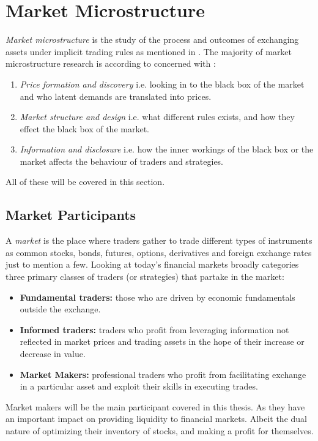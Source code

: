 \documentclass{kththesis}
\theoremstyle{definition}
\begin{document}



\section{Market Microstructure}
\textit{Market microstructure} is the study of the process and outcomes of exchanging assets under implicit trading rules as mentioned in \textcite{o1995market}. The majority of market microstructure research is according to \textcite{madhavan2000market} concerned with : 
\begin{enumerate}
    \item \textit{Price formation and discovery} i.e. looking in to the black box of the market and who latent demands are translated into prices.
    \item \textit{Market structure and design} i.e. what different rules exists, and how they effect the black box of the market.
    \item \textit{Information and disclosure} i.e. how the inner workings of the black box or the market affects the behaviour of traders and strategies.
\end{enumerate}
All of these will be covered in this section.

\newpage

\subsection{Market Participants}
A \textit{market} is the place where traders gather to trade \parencite{harris2003trading} different types of instruments as common stocks, bonds, futures, options, derivatives and foreign exchange rates just to mention a few.
Looking at today's financial markets
\textcite{cartea2015algorithmic} broadly categories three primary classes of traders (or strategies) that partake in the market:
\begin{itemize}
    \item \textbf{Fundamental traders:} those who are driven by economic fundamentals outside the exchange.
    \item \textbf{Informed traders:} traders who profit from leveraging information not reflected in market prices and trading assets in the hope of their increase or decrease in value.
    \item \textbf{Market Makers:} professional traders who profit from facilitating exchange in a particular asset and exploit their skills in executing trades.
\end{itemize}
Market makers will be the main participant covered in this thesis. As they have an important impact on providing liquidity to financial markets. Albeit the dual nature of optimizing their inventory of stocks, and making a profit for themselves.
\end{document}
